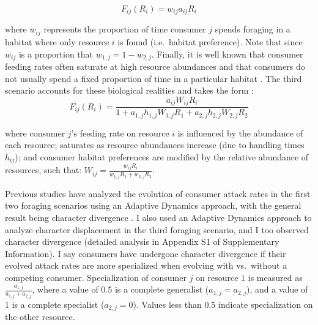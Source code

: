 \documentclass[11pt,]{article}
\begin{document}
\begin{equation} \label{eq:3}
  F_{ij}(R_i)=w_{ij}a_{ij}R_i
\end{equation}

where \(w_{ij}\) represents the proportion of time consumer \(j\) spends
foraging in a habitat where only resource \(i\) is found (i.e.~habitat
preference). Note that since \(w_{ij}\) is a proportion that
\(w_{1,j}=1-w_{2,j}\). Finally, it is well known that consumer feeding
rates often saturate at high resource abundances
\citep{Holling1959, Rosenzweig1963, Murdoch2003, McCann2011} and that
consumers do not usually spend a fixed proportion of time in a
particular habitat \citep{McCann2005}. The third scenario accounts for
these biological realities and takes the form \citep[derived
by][]{McCann2005}:\\

\begin{equation} \label{eq:4}
  F_{ij}(R_i)=\frac{a_{ij}W_{ij}R_i}{1+a_{1,j}h_{1,j}W_{1,j}R_1+a_{2,j}h_{2,j}W_{2,j}R_2}
\end{equation}

where consumer \(j\)'s feeding rate on resource \(i\) is influenced by
the abundance of each resource; saturates as resource abundances
increase (due to handling times \(h_{ij}\)); and consumer habitat
preferences are modified by the relative abundance of resources, such
that: \(W_{ij}=\frac{w_{ij}R_i}{w_{1,j}R_1+w_{2,j}R_2}\).

Previous studies have analyzed the evolution of consumer attack rates in
the first two foraging scenarios using an Adaptive Dynamics approach,
with the general result being character divergence
\citep{Lawlor1976, Abrams1986}. I also used an Adaptive Dynamics
approach to analyze character displacement in the third foraging
scenario, and I too observed character divergence (detailed analysis in
Appendix S1 of Supplementary Information). I say consumers have
undergone character divergence if their evolved attack rates are more
specialized when evolving with vs.~without a competing consumer.
Specialization of consumer \(j\) on resource \(1\) is measured as
\(\frac{a_{1,j}}{a_{1,j}+a_{2,j}}\), where a value of 0.5 is a complete
generalist (\(a_{1,j}=a_{2,j}\)), and a value of 1 is a complete
specialist (\(a_{2,j}=0\)). Values less than 0.5 indicate specialization
on the other resource.
\end{document}
